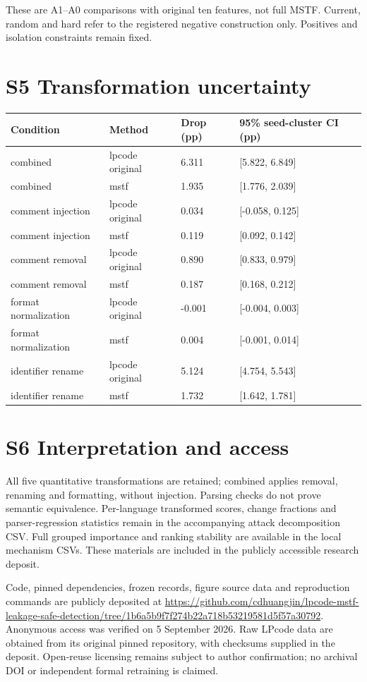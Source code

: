 \documentclass[
  10pt,
]{article}
\newcounter{none} %
\begin{document}
These are A1--A0 comparisons with original ten features, not full MSTF.
Current, random and hard refer to the registered negative construction
only. Positives and isolation constraints remain fixed.

\section{S5 Transformation
uncertainty}\label{s5-transformation-uncertainty}

{\def\LTcaptype{none} %
\begin{longtable}[]{@{}llll@{}}
\toprule\noalign{}
Condition & Method & Drop (pp) & 95\% seed-cluster CI (pp) \\
\midrule\noalign{}
\endhead
\bottomrule\noalign{}
\endlastfoot
combined & lpcode original & 6.311 & {[}5.822, 6.849{]} \\
combined & mstf & 1.935 & {[}1.776, 2.039{]} \\
comment injection & lpcode original & 0.034 & {[}-0.058, 0.125{]} \\
comment injection & mstf & 0.119 & {[}0.092, 0.142{]} \\
comment removal & lpcode original & 0.890 & {[}0.833, 0.979{]} \\
comment removal & mstf & 0.187 & {[}0.168, 0.212{]} \\
format normalization & lpcode original & -0.001 & {[}-0.004, 0.003{]} \\
format normalization & mstf & 0.004 & {[}-0.001, 0.014{]} \\
identifier rename & lpcode original & 5.124 & {[}4.754, 5.543{]} \\
identifier rename & mstf & 1.732 & {[}1.642, 1.781{]} \\
\end{longtable}
}

\section{S6 Interpretation and
access}\label{s6-interpretation-and-access}

All five quantitative transformations are retained; combined applies
removal, renaming and formatting, without injection. Parsing checks do
not prove semantic equivalence. Per-language transformed scores, change
fractions and parser-regression statistics remain in the accompanying
attack decomposition CSV. Full grouped importance and ranking stability
are available in the local mechanism CSVs. These materials are included
in the publicly accessible research deposit.

Code, pinned dependencies, frozen records, figure source data and
reproduction commands are publicly deposited at
\url{https://github.com/cdhuangjin/lpcode-mstf-leakage-safe-detection/tree/1b6a5b9f7f274b22a718b53219581d5f57a30792}.
Anonymous access was verified on 5 September 2026. Raw LPcode data are
obtained from its original pinned repository, with checksums supplied in
the deposit. Open-reuse licensing remains subject to author
confirmation; no archival DOI or independent formal retraining is
claimed.
\end{document}
